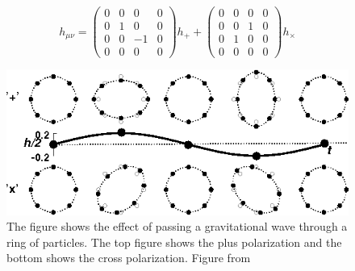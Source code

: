 \documentclass{ttuthes2007}
\begin{document}
\begin{equation*}                                                               
h_{\mu\nu}=     
 \begin{pmatrix}                                                                
    0 & 0 & 0 & 0 \\                                                            
    0 & 1 & 0 & 0 \\                                                            
    0 & 0 & -1 & 0 \\                                                            
    0 & 0 & 0 & 0                                                               
 \end{pmatrix}
h_+  
+
 \begin{pmatrix}                                                                
    0 & 0 & 0 & 0 \\                                                            
    0 & 0 & 1 & 0 \\                                                            
    0 & 1 & 0 & 0 \\                                                            
    0 & 0 & 0 & 0                                                               
 \end{pmatrix}
h_\times                                                                  
\end{equation*} 

\begin{figure}[h!]                                                              
	\includegraphics[width=\textwidth]{figure/polarization.png}
	\caption{The figure shows the effect of passing a gravitational wave
through a ring of particles. The top figure shows the plus polarization and the
bottom shows the cross polarization. Figure from ~\cite{Schutz}}                                                     
        \label{fig:polarization}
\end{figure}
\end{document}
